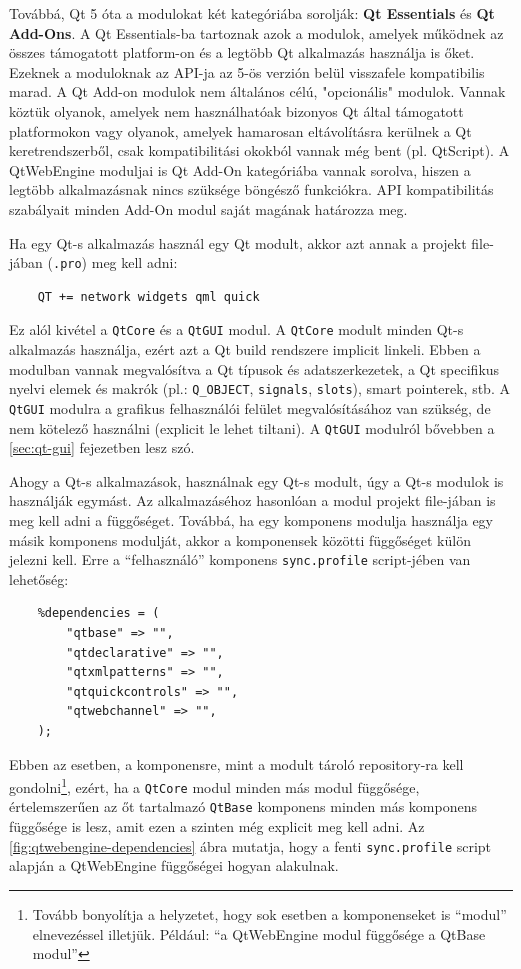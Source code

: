 \documentclass[12pt]{report}
\begin{document}
Továbbá, Qt 5 óta a modulokat két kategóriába sorolják: \textbf{Qt Essentials} és
\textbf{Qt Add-Ons}. A Qt Essentials-ba tartoznak azok a modulok, amelyek működnek az
összes támogatott platform-on és a legtöbb Qt alkalmazás használja is őket. Ezeknek a
moduloknak az API-ja az 5-ös verzión belül visszafele kompatibilis marad.
A Qt Add-on modulok nem általános célú, "opcionális" modulok. Vannak köztük olyanok,
amelyek nem használhatóak bizonyos Qt által támogatott platformokon vagy olyanok, amelyek
hamarosan eltávolításra kerülnek a Qt keretrendszerből, csak kompatibilitási okokból vannak
még bent (pl. QtScript). A QtWebEngine moduljai is Qt Add-On kategóriába vannak sorolva,
hiszen a legtöbb alkalmazásnak nincs szüksége böngésző funkciókra. API kompatibilitás
szabályait minden Add-On modul saját magának határozza meg.
\cite{bib:qt-doc-qtmodules}

Ha egy Qt-s alkalmazás használ egy Qt modult, akkor azt annak a projekt file-jában
(\texttt{.pro}) meg kell adni:
\begin{verbatim}
    QT += network widgets qml quick
\end{verbatim}
Ez alól kivétel a \texttt{QtCore} és a \texttt{QtGUI} modul. A \texttt{QtCore} modult
minden Qt-s alkalmazás használja, ezért azt a Qt build rendszere implicit linkeli.
Ebben a modulban vannak megvalósítva a Qt típusok és adatszerkezetek, a Qt specifikus nyelvi
elemek és makrók (pl.: \texttt{Q\_OBJECT}, \texttt{signals}, \texttt{slots}),
smart pointerek, stb. A \texttt{QtGUI} modulra a grafikus felhasználói felület
megvalósításához van szükség, de nem kötelező használni (explicit le lehet tiltani).
A \texttt{QtGUI} modulról bővebben a \ref{sec:qt-gui} fejezetben lesz szó.

Ahogy a Qt-s alkalmazások, használnak egy Qt-s modult, úgy a Qt-s modulok is használják
egymást. Az alkalmazáséhoz hasonlóan a modul projekt file-jában is meg kell adni a
függőséget. Továbbá, ha egy komponens modulja használja egy másik komponens modulját, akkor
a komponensek közötti függőséget külön jelezni kell. Erre a ``felhasználó'' komponens
\texttt{sync.profile} script-jében van lehetőség:
\begin{verbatim}
    %dependencies = (
        "qtbase" => "",
        "qtdeclarative" => "",
        "qtxmlpatterns" => "",
        "qtquickcontrols" => "",
        "qtwebchannel" => "",
    );
\end{verbatim}

\noindent
Ebben az esetben, a komponensre, mint a modult tároló repository-ra kell
gondolni\footnote{Tovább bonyolítja a helyzetet, hogy sok esetben a komponenseket is
``modul'' elnevezéssel illetjük. Például: ``a QtWebEngine modul függősége a QtBase modul''},
ezért, ha a \texttt{QtCore} modul minden más modul függősége, értelemszerűen az őt tartalmazó
\texttt{QtBase} komponens minden más komponens függősége is lesz, amit ezen a szinten
még explicit meg kell adni.
Az \ref{fig:qtwebengine-dependencies} ábra mutatja, hogy a fenti \texttt{sync.profile} script
alapján a QtWebEngine függőségei hogyan alakulnak.
\end{document}
